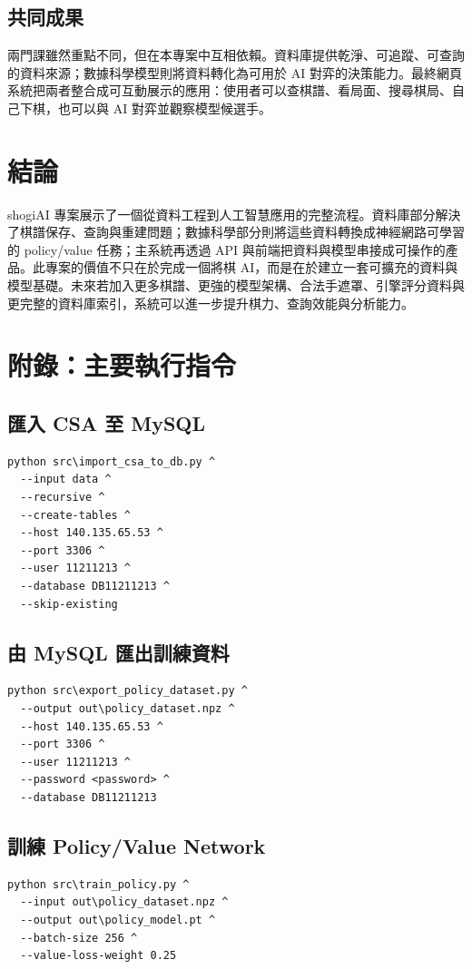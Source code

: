 \documentclass[12pt,a4paper,fontset=none]{ctexart}
\begin{document}
\subsection{共同成果}
兩門課雖然重點不同，但在本專案中互相依賴。資料庫提供乾淨、可追蹤、可查詢的資料來源；數據科學模型則將資料轉化為可用於 AI 對弈的決策能力。最終網頁系統把兩者整合成可互動展示的應用：使用者可以查棋譜、看局面、搜尋棋局、自己下棋，也可以與 AI 對弈並觀察模型候選手。

\section{結論}
shogiAI 專案展示了一個從資料工程到人工智慧應用的完整流程。資料庫部分解決了棋譜保存、查詢與重建問題；數據科學部分則將這些資料轉換成神經網路可學習的 policy/value 任務；主系統再透過 API 與前端把資料與模型串接成可操作的產品。此專案的價值不只在於完成一個將棋 AI，而是在於建立一套可擴充的資料與模型基礎。未來若加入更多棋譜、更強的模型架構、合法手遮罩、引擎評分資料與更完整的資料庫索引，系統可以進一步提升棋力、查詢效能與分析能力。

\appendix
\section{附錄：主要執行指令}

\subsection{匯入 CSA 至 MySQL}
\begin{lstlisting}[style=cmd]
python src\import_csa_to_db.py ^
  --input data ^
  --recursive ^
  --create-tables ^
  --host 140.135.65.53 ^
  --port 3306 ^
  --user 11211213 ^
  --database DB11211213 ^
  --skip-existing
\end{lstlisting}

\subsection{由 MySQL 匯出訓練資料}
\begin{lstlisting}[style=cmd]
python src\export_policy_dataset.py ^
  --output out\policy_dataset.npz ^
  --host 140.135.65.53 ^
  --port 3306 ^
  --user 11211213 ^
  --password <password> ^
  --database DB11211213
\end{lstlisting}

\subsection{訓練 Policy/Value Network}
\begin{lstlisting}[style=cmd]
python src\train_policy.py ^
  --input out\policy_dataset.npz ^
  --output out\policy_model.pt ^
  --batch-size 256 ^
  --value-loss-weight 0.25
\end{lstlisting}
\end{document}
